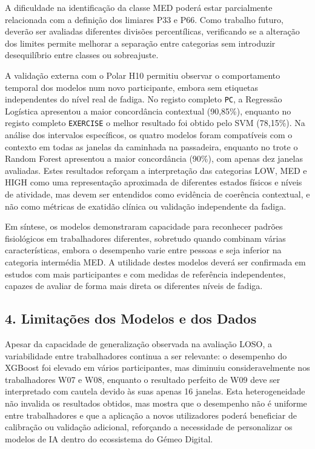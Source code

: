 A dificuldade na identificação da classe MED poderá estar parcialmente relacionada com a definição dos limiares P33 e P66. Como trabalho futuro, deverão ser avaliadas diferentes divisões percentílicas, verificando se a alteração dos limites permite melhorar a separação entre categorias sem introduzir desequilíbrio entre classes ou sobreajuste.

A validação externa com o Polar H10 permitiu observar o comportamento temporal dos modelos num novo participante, embora sem etiquetas independentes do nível real de fadiga. No registo completo \texttt{PC}, a Regressão Logística apresentou a maior concordância contextual (90,85\%), enquanto no registo completo \texttt{EXERCISE} o melhor resultado foi obtido pelo SVM (78,15\%). Na análise dos intervalos específicos, os quatro modelos foram compatíveis com o contexto em todas as janelas da caminhada na passadeira, enquanto no trote o Random Forest apresentou a maior concordância (90\%), com apenas dez janelas avaliadas. Estes resultados reforçam a interpretação das categorias LOW, MED e HIGH como uma representação aproximada de diferentes estados físicos e níveis de atividade, mas devem ser entendidos como evidência de coerência contextual, e não como métricas de exatidão clínica ou validação independente da fadiga.

Em síntese, os modelos demonstraram capacidade para reconhecer padrões fisiológicos em trabalhadores diferentes, sobretudo quando combinam várias características, embora o desempenho varie entre pessoas e seja inferior na categoria intermédia MED. A utilidade destes modelos deverá ser confirmada em estudos com mais participantes e com medidas de referência independentes, capazes de avaliar de forma mais direta os diferentes níveis de fadiga.

\subsection*{4. Limitações dos Modelos e dos Dados}

Apesar da capacidade de generalização observada na avaliação LOSO, a variabilidade entre trabalhadores continua a ser relevante: o desempenho do XGBoost foi elevado em vários participantes, mas diminuiu consideravelmente nos trabalhadores W07 e W08, enquanto o resultado perfeito de W09 deve ser interpretado com cautela devido às suas apenas 16 janelas. Esta heterogeneidade não invalida os resultados obtidos, mas mostra que o desempenho não é uniforme entre trabalhadores e que a aplicação a novos utilizadores poderá beneficiar de calibração ou validação adicional, reforçando a necessidade de personalizar os modelos de IA dentro do ecossistema do Gémeo Digital.

